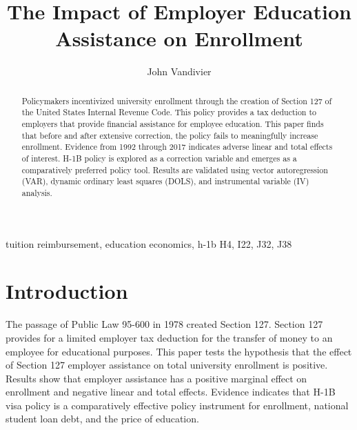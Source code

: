 \documentclass[review]{elsarticle}
\begin{document}
\begin{frontmatter}

    \title{
        The Impact of Employer Education Assistance on Enrollment
    }

    \author[mymainaddress]{John Vandivier} %
    \address[mymainaddress]{4400 University Dr, Fairfax, VA 22030}

    \begin{abstract}
        Policymakers incentivized university enrollment through the creation of Section 127 of the United States Internal Revenue Code.
        This policy provides a tax deduction to employers that provide financial assistance for employee education.
        This paper finds that before and after extensive correction, the policy fails to meaningfully increase enrollment.
        Evidence from 1992 through 2017 indicates adverse linear and total effects of interest.
        H-1B policy is explored as a correction variable and emerges as a comparatively preferred policy tool.
        Results are validated using vector autoregression (VAR), dynamic ordinary least squares (DOLS), and instrumental variable (IV) analysis.
    \end{abstract}

    \begin{keyword}
        tuition reimbursement, education economics, h-1b %
        \MSC[2010] H4, I22, J32, J38
    \end{keyword}
\end{frontmatter}

\pagebreak
\linenumbers

\section{Introduction}
The passage of Public Law 95-600 in 1978 created Section 127\cite{plaw95_600_1978}.
Section 127 provides for a limited employer tax deduction for the transfer of money to an employee for educational purposes.
This paper tests the hypothesis that the effect of Section 127 employer assistance on total university enrollment is positive.
Results show that employer assistance has a positive marginal effect on enrollment and negative linear and total effects.
Evidence indicates that H-1B visa policy is a comparatively effective policy instrument for enrollment,
national student loan debt, and the price of education.
\end{document}
